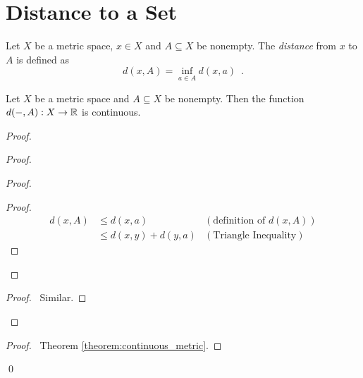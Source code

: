 \section{Distance to a Set}

\begin{definition}
    Let $X$ be a metric space, $x \in X$ and $A \subseteq X$ be nonempty. The \emph{distance} from $x$ to $A$ is defined as
    \[ d(x,A) = \inf_{a \in A} d(x,a) \enspace . \]
\end{definition}

\begin{proposition}
    \label{proposition:distance_continuous}
    Let $X$ be a metric space and $A \subseteq X$ be nonempty. Then the function
    $d(-,A) : X \rightarrow \mathbb{R}$ is continuous.
\end{proposition}

\begin{proof}
    \pf
    \begin{proof}
        \begin{proof}
            \pf
            \begin{proof}
                \pf
                \begin{align*}
                    d(x,A) & \leq d(x,a) & (\text{definition of $d(x,A)$})\\
                    & \leq d(x,y) + d(y,a) & (\text{Triangle Inequality})
                \end{align*}
            \end{proof}
        \end{proof}
        \begin{proof}
            \pf\ Similar.
        \end{proof}
    \end{proof}
    \qedstep
    \begin{proof}
        \pf\ Theorem \ref{theorem:continuous_metric}.
    \end{proof}
    \qed
\end{proof}

